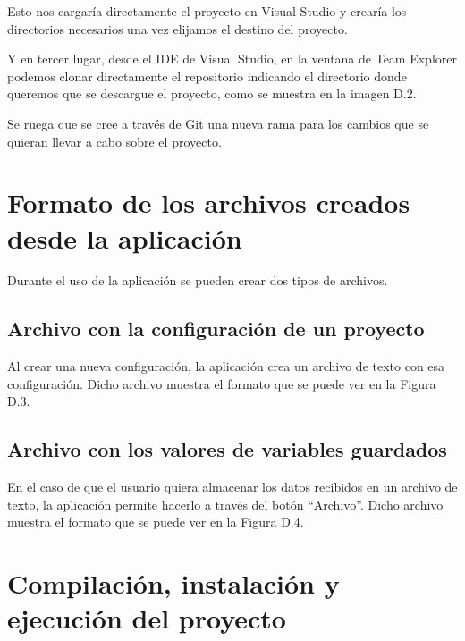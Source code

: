 
Esto nos cargaría directamente el proyecto en Visual Studio y crearía los directorios necesarios una vez elijamos el destino del proyecto.

Y en tercer lugar, desde el IDE de Visual Studio, en la ventana de Team Explorer podemos clonar directamente el repositorio indicando el directorio donde queremos que se descargue el proyecto, como se muestra en la imagen D.2.


Se ruega que se cree a través de Git una nueva rama para los cambios que se quieran llevar a cabo sobre el proyecto.

\section{Formato de los archivos creados desde la aplicación}

Durante el uso de la aplicación se pueden crear dos tipos de archivos.

\subsection{Archivo con la configuración de un proyecto}

Al crear una nueva configuración, la aplicación crea un archivo de texto con esa configuración. Dicho archivo muestra el formato que se puede ver en la Figura D.3.


\subsection{Archivo con los valores de variables guardados}

En el caso de que el usuario quiera almacenar los datos recibidos en un archivo de texto, la aplicación permite hacerlo a través del botón ``Archivo''. Dicho archivo muestra el formato que se puede ver en la Figura D.4.


\section{Compilación, instalación y ejecución del proyecto}


